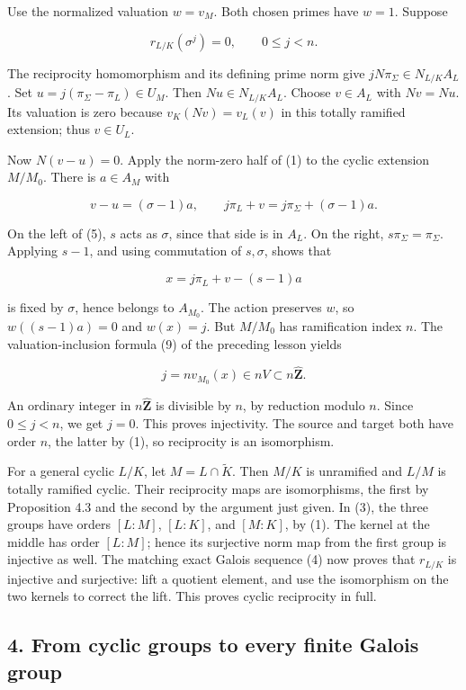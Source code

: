 \documentclass[11pt,a4paper]{article}
\begin{document}
Use the normalized valuation \(w=v_M\). Both chosen primes have \(w=1\).
Suppose

\[
r_{L/K}(\sigma^j)=0,\qquad 0\leq j<n.
\]

The reciprocity homomorphism and its defining prime norm give
\(jN\pi_\Sigma\in N_{L/K}A_L\). Set \(u=j(\pi_\Sigma-\pi_L)\in U_M\).
Then \(Nu\in N_{L/K}A_L\). Choose \(v\in A_L\) with \(Nv=Nu\). Its
valuation is zero because \(v_K(Nv)=v_L(v)\) in this totally ramified
extension; thus \(v\in U_L\).

Now \(N(v-u)=0\). Apply the norm-zero half of (1) to the cyclic
extension \(M/M_0\). There is \(a\in A_M\) with

\[
v-u=(\sigma-1)a,\qquad
j\pi_L+v=j\pi_\Sigma+(\sigma-1)a.
\tag{5}
\]

On the left of (5), \(s\) acts as \(\sigma\), since that side is in
\(A_L\). On the right, \(s\pi_\Sigma=\pi_\Sigma\). Applying \(s-1\), and
using commutation of \(s,\sigma\), shows that

\[
x=j\pi_L+v-(s-1)a
\]

is fixed by \(\sigma\), hence belongs to \(A_{M_0}\). The action
preserves \(w\), so \(w((s-1)a)=0\) and \(w(x)=j\). But \(M/M_0\) has
ramification index \(n\). The valuation-inclusion formula (9) of the
preceding lesson yields

\[
j=n v_{M_0}(x)\in nV\subset n\widehat{\mathbf Z}.
\]

An ordinary integer in \(n\widehat{\mathbf Z}\) is divisible by \(n\),
by reduction modulo \(n\). Since \(0\leq j<n\), we get \(j=0\). This
proves injectivity. The source and target both have order \(n\), the
latter by (1), so reciprocity is an isomorphism.

For a general cyclic \(L/K\), let \(M=L\cap\widetilde K\). Then \(M/K\)
is unramified and \(L/M\) is totally ramified cyclic. Their reciprocity
maps are isomorphisms, the first by Proposition 4.3 and the second by
the argument just given. In (3), the three groups have orders \([L:M]\),
\([L:K]\), and \([M:K]\), by (1). The kernel at the middle has order
\([L:M]\); hence its surjective norm map from the first group is
injective as well. The matching exact Galois sequence (4) now proves
that \(r_{L/K}\) is injective and surjective: lift a quotient element,
and use the isomorphism on the two kernels to correct the lift. This
proves cyclic reciprocity in full.

\subsection{4. From cyclic groups to every finite Galois
group}\label{from-cyclic-groups-to-every-finite-galois-group}
\end{document}

